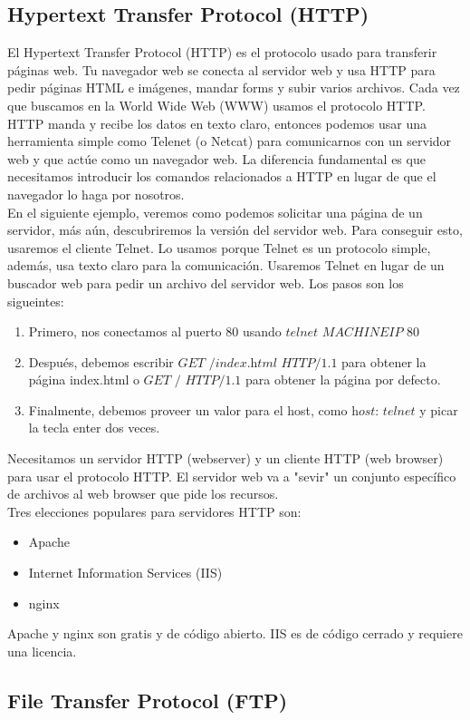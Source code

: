 \documentclass[12pt]{report}
\begin{document}
\subsection{Hypertext Transfer Protocol (HTTP) }
El Hypertext Transfer Protocol (HTTP) es el protocolo usado
para transferir páginas web. Tu navegador web se conecta 
al servidor web y usa HTTP para pedir páginas HTML e imágenes, 
mandar forms y subir varios archivos. 
Cada vez que buscamos en la World Wide Web (WWW) usamos el protocolo
HTTP.\\
HTTP manda y recibe los datos en texto claro, entonces podemos
usar una herramienta simple como Telenet (o Netcat) para 
comunicarnos con un servidor web y que actúe como un 
navegador web. La diferencia fundamental es que necesitamos
introducir los comandos relacionados a HTTP en lugar de que el 
navegador lo haga por nosotros.\\
En el siguiente ejemplo, veremos como podemos solicitar una página
de un servidor, más aún, descubriremos la versión del servidor web.
Para conseguir esto, usaremos el cliente Telnet. Lo usamos
porque Telnet es un protocolo simple, además, usa texto claro 
para la comunicación. Usaremos Telnet en lugar de un buscador web 
para pedir un archivo del servidor web. Los pasos son los sigueintes:
\begin{enumerate}
  \item Primero, nos conectamos al puerto 80 usando $\textit{telnet MACHINEIP 80}$
  \item Después, debemos escribir $\textit{GET /index.html HTTP/1.1}$ para 
    obtener la página index.html o $\textit{GET / HTTP/1.1}$ para 
    obtener la página por defecto.
  \item Finalmente, debemos proveer un valor para el host, como $\textit{host: telnet}$ 
    y picar la tecla enter dos veces.
\end{enumerate}
Necesitamos un servidor HTTP (webserver) y un cliente HTTP (web browser)
para usar el protocolo HTTP. El servidor web va a "sevir" un conjunto 
específico de archivos al web browser que pide los recursos.\\
Tres elecciones populares para servidores HTTP son:
\begin{itemize}
  \item Apache
  \item Internet Information Services (IIS)
  \item nginx
\end{itemize}
Apache y nginx son gratis y de código abierto. IIS es de código cerrado
y requiere una licencia.\\

\subsection{File Transfer Protocol (FTP)}
\end{document}
